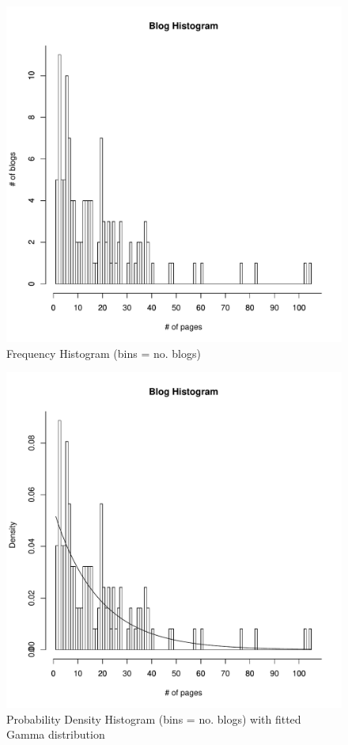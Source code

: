 \begin{figure}
\centering
\includegraphics[width=.8\textwidth]{../q1/freqHist.pdf}
\caption{Frequency Histogram (bins = no. blogs)}
\end{figure}



\begin{figure}
  \centering
  \includegraphics[width=.7\linewidth]{../q1/densHist.pdf}
  \caption{Probability Density Histogram (bins = no. blogs) with fitted Gamma distribution}
\end{figure}%



